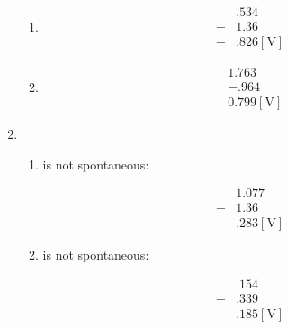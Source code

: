 \documentclass[12pt]{article}
\begin{document}
\begin{enumerate}
\begin{enumerate}
      \item {}

        \begin{equation}
          \begin{split}
            \,\,&.534\\
            \,\,-&1.36\\
            \hline
            \,\,-&.826[\si{\volt}]
          \end{split}
          \label{2}
        \end{equation}

      \item {}

        \begin{equation}
          \begin{split}
            \,\,&1.763\\
            \,\,&-.964\\
            \hline
            \,\,&0.799[\si{\volt}]
          \end{split}
          \label{3}
        \end{equation}


    \end{enumerate}

  \item

    \begin{enumerate}

      \item {} is not spontaneous:

        \begin{equation}
          \begin{split}
            \,\,&1.077\\
            \,\,-&1.36\\
            \hline
            \,\,-&.283[\si{\volt}]
          \end{split}
          \label{4}
        \end{equation}

      \item {} is not spontaneous:

        \begin{equation}
          \begin{split}
            \,\,&.154\\
            \,\,-&.339\\
            \hline
            \,\,-&.185[\si{\volt}]
          \end{split}
          \label{5}
        \end{equation}



\end{enumerate}
\end{enumerate}
\end{document}
